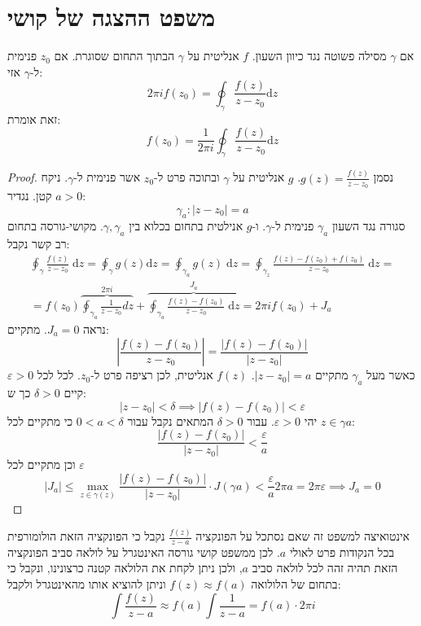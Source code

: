 \documentclass{tstextbook}
\begin{document}
\section{משפט ההצגה של קושי}

\begin{theorem}
אם \(\gamma\) מסילה פשוטה נגד כיוון השעון. \(f\) אנליטית על \(\gamma\) הבתוך התחום שסוגרת.
אם \(z_{0}\) פנימית ל-\(\gamma\) אזי:
$$2\pi i f(z_{0})=\oint_{\gamma} \frac{f(z)}{z-z_{0}} \mathrm{d}z$$
זאת אומרת:
$$f(z_{0})=\frac{1}{2\pi i}\oint_{\gamma} \frac{f(z)}{z-z_{0}}\mathrm{d}z$$

\end{theorem}
\begin{proof}
נסמן \(g(z)=\frac{f(z)}{z-z_{0}}\). \(g\) אנליטית על \(\gamma\) ובתוכה פרט ל-\(z_{0}\) אשר פנימית ל-\(\gamma\).
ניקח \(a>0\) קטן. נגדיר:
$$\gamma_{a}:\lvert z-z_{0} \rvert = a$$
סגורה נגד השעון \(\gamma_{a}\) פנימית ל-\(\gamma\). ו-\(g\) אנילטית בתחום בכלוא בין \(\gamma,\gamma_{a}\). מקושי-גורסה בתחום רב קשר נקבל:
\begin{gather*}\oint_{\gamma} \frac{f(z)}{z-z_{0}}\;\mathrm{d}z=\oint_{\gamma}g(z)\mathrm{d}z=\oint_{\gamma_{a}}g(z)\;\mathrm{d}z=\oint_{\gamma_{z}} \frac{f(z)-f(z_{0})+f(z_{0})}{z-z_{0}}\;\mathrm{d}z= \\=f(z_{0})\overbrace{ \oint_{\gamma_{a}} \frac{1}{z-z_{0}}dz }^{ 2\pi i }+\overbrace{ \oint_{\gamma_{a}}\frac{f(z)-f(z_{0})}{z-z_{0}}\;\mathrm{d}z }^{ J_{a} }=2\pi if(z_{0})+J_{a} 
\end{gather*}
נראה \(J_{a}=0\). מתקיים:
$$\left\lvert  \frac{f(z)-f(z_{0})}{z-z_{0}}  \right\rvert =\frac{\lvert f(z)-f(z_{0}) \rvert}{\lvert z-z_{0} \rvert } $$
כאשר מעל \(\gamma _a\) מתקיים \(\lvert z-z_{0} \rvert=a\). \(f(z)\) אנליטית, לכן רציפה פרט ל-\(z_{0}\). לכל לכל \(\varepsilon>0\) קיים \(\delta > 0\) כך ש:
$$\lvert z-z_{0} \rvert <\delta \implies \lvert f(z)-f(z_{0}) \rvert <\varepsilon$$
יהי \(\varepsilon>0\). עבור \(\delta>0\) המתאים נקבל עבור \(0<a<\delta\) כי מתקיים לכל \(z \in \gamma a\):
$$\frac{\lvert f(z)-f(z_{0}) \rvert }{\lvert z-z_{0} \rvert }<\frac{\varepsilon}{a}$$
וכן מתקיים לכל \(\varepsilon\)$$\lvert J_{a} \rvert \leq \max _{z \in \gamma(z)}\frac{\lvert f(z)-f(z_{0}) \rvert }{\lvert z-z_{0} \rvert }\cdot J\left( \gamma a \right) < \frac{\varepsilon}{a} 2 \pi a = 2 \pi \varepsilon\implies J_{a} = 0$$

\end{proof}
אינטואיצה למשפט זה שאם נסתכל על הפונקציה \(\frac{f(z)}{z-a}\) נקבל כי הפונקציה הזאת הולומורפית בכל הנקודות פרט לאולי \(a\). לכן ממשפט קושי גורסה האינטגרל על לולאה סביב הפונקציה הזאת תהיה זהה לכל לולאה סביב \(a\), ולכן ניתן לקחת את הלולאה קטנה כרצונינו, ונקבל כי בתחום של הלולואה \(f(z)\approx f(a)\) וניתן להוציא אותו מהאינטגרל ולקבל:
$$\int \frac{f(z)}{z-a}\approx f(a) \int \frac{1}{z-a}=f(a) \cdot 2\pi i$$
\end{document}

